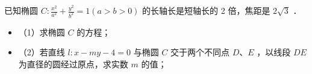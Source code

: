 \vspace{6em}

\begin{example}
    已知椭圆 $C: \frac{x^2}{a^2}+\frac{y^2}{b^2}=1(a>b>0)$ 的长轴长是短轴长的 2 倍，焦距是 $2 \sqrt{3}$ ．
    \begin{itemize}
        \item （1）求椭圆 $C$ 的方程；
        \item （2）若直线 $l: x-m y-4=0$ 与椭圆 $C$ 交于两个不同点 $D$、$E$ ，以线段 $D E$ 为直径的圆经过原点，求实数 $m$ 的值；
    \end{itemize}
\end{example}

\vspace{6em}




